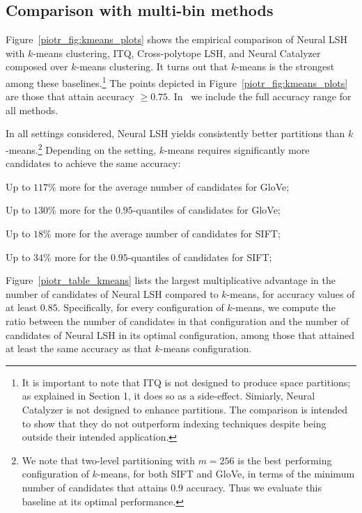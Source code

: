 \documentclass[11pt]{article}
\newcommand{\todoir}[2]{}
\newcommand{\irnote}[1]{\todoir{red}{IR: ``#1''}}
\newcommand{\twnote}[1]{\todoir{orange}{TW: ``#1''}}
\newcommand{\ynote}[1]{\todoir{cyan}{YD: ``#1''}}
\begin{document}

\subsection{Comparison with multi-bin methods}\label{piotr_sec:kmeanscomparison}
Figure~\ref{piotr_fig:kmeans_plots} shows the empirical comparison of Neural LSH with $k$-means clustering, ITQ, Cross-polytope LSH, and Neural Catalyzer composed over $k$-means clustering.
It turns out that $k$-means is the strongest among these baselines.\footnote{It is important to note that ITQ is not designed to produce space partitions; as explained in Section 1, it does so as a side-effect. Simiarly, Neural Catalyzer is not designed to enhance partitions. The comparison is intended to show that they do not outperform indexing techniques despite being outside their intended application.} 
The points depicted in Figure~\ref{piotr_fig:kmeans_plots} are those that attain accuracy $\geq0.75$. In~\cite{arxiv} we include the full accuracy range for all methods.


In all settings considered, 
Neural LSH yields consistently better partitions than $k$-means.\footnote{We note that two-level partitioning with $m=256$ is the best performing configuration of $k$-means, for both SIFT and GloVe, in terms of the minimum number of candidates that attains $0.9$ accuracy. Thus we evaluate this baseline at its optimal performance.} Depending on the setting, $k$-means requires significantly more candidates to achieve the same accuracy:
\begin{CompactItemize}
    \item Up to $117\%$ more for the average number of candidates for GloVe;
    \item Up to $130\%$ more for the $0.95$-quantiles of candidates for GloVe;
    \item Up to $18\%$ more for the average number of candidates for SIFT;
    \item Up to $34\%$ more for the $0.95$-quantiles of candidates for SIFT;
\end{CompactItemize}
Figure~\ref{piotr_table_kmeans} lists the largest multiplicative advantage in the number of candidates of Neural LSH compared to $k$-means, for accuracy values of at least $0.85$.
Specifically, for every configuration of $k$-means, we compute the ratio between the number of candidates in that configuration and the number of candidates of Neural LSH in its optimal configuration, among those that attained at least the same accuracy as that $k$-means configuration.
\end{document}

